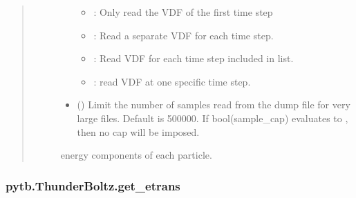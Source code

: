 \documentclass[letterpaper,10pt,english,openany,oneside]{sphinxmanual}
\begin{document}
\begin{fulllineitems}
\begin{fulllineitems}
\begin{quote}
\begin{description}
\begin{itemize}
\begin{itemize}
\item {} 
\sphinxAtStartPar
{}: Only read the VDF of the first time step

\item {} 
\sphinxAtStartPar
{}: Read a separate VDF for each time step.

\item {} 
\sphinxAtStartPar
{}: Read VDF for each time step included in list.

\item {} 
\sphinxAtStartPar
{}: read VDF at one specific time step.

\end{itemize}


\item {} 
\sphinxAtStartPar
{} () \textendash{} Limit the number of samples read from the dump
file for very large files. Default is 500000. If bool(sample\_cap)
evaluates to , then no cap will be imposed.

\end{itemize}

\sphinxAtStartPar
\begin{description}
\sphinxAtStartPar
energy components of each particle.

\end{description}


\sphinxAtStartPar
{}

\end{description}\end{quote}

\end{fulllineitems}


\sphinxstepscope


\subsubsection{pytb.ThunderBoltz.get\_etrans}
\label{\detokenize{api/pytb.ThunderBoltz.get_etrans:pytb-thunderboltz-get-etrans}}\label{\detokenize{api/pytb.ThunderBoltz.get_etrans::doc}}


\end{fulllineitems}
\end{document}
